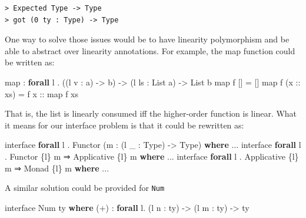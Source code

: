 \documentclass[
]{article}
\newenvironment{Shaded}{}{}
\newcommand{\DataTypeTok}[1]{\textcolor[rgb]{0.56,0.13,0.00}{#1}}
\newcommand{\FunctionTok}[1]{\textcolor[rgb]{0.02,0.16,0.49}{#1}}
\newcommand{\KeywordTok}[1]{\textcolor[rgb]{0.00,0.44,0.13}{\textbf{#1}}}
\newcommand{\NormalTok}[1]{#1}
\newcommand{\OperatorTok}[1]{\textcolor[rgb]{0.40,0.40,0.40}{#1}}
\newcommand{\OtherTok}[1]{\textcolor[rgb]{0.00,0.44,0.13}{#1}}
\begin{document}
\begin{verbatim}
> Expected Type -> Type
> got (0 ty : Type) -> Type
\end{verbatim}

One way to solve those issues would be to have linearity polymorphism
and be able to abstract over linearity annotations. For example, the map
function could be written as:

\begin{Shaded}
\begin{Highlighting}[]
\FunctionTok{map} \OperatorTok{:} \KeywordTok{forall}\NormalTok{ l }\OperatorTok{.}\NormalTok{ ((l v }\OperatorTok{:}\NormalTok{ a) }\OtherTok{{-}\textgreater{}}\NormalTok{ b) }\OtherTok{{-}\textgreater{}}\NormalTok{ (l ls }\OperatorTok{:} \DataTypeTok{List}\NormalTok{ a) }\OtherTok{{-}\textgreater{}} \DataTypeTok{List}\NormalTok{ b}
\FunctionTok{map}\NormalTok{ f [] }\OtherTok{=}\NormalTok{ []}
\FunctionTok{map}\NormalTok{ f (}\OtherTok{x ::}\NormalTok{ xs) }\OtherTok{=}\NormalTok{ f}\OtherTok{ x ::} \FunctionTok{map}\NormalTok{ f xs}
\end{Highlighting}
\end{Shaded}

That is, the list is linearly consumed iff the higher-order function is
linear. What it means for our interface problem is that it could be
rewritten as:

\begin{Shaded}
\begin{Highlighting}[]
\NormalTok{interface }\KeywordTok{forall}\NormalTok{ l }\OperatorTok{.} \DataTypeTok{Functor}\NormalTok{ (m }\OperatorTok{:}\NormalTok{ (l \_ }\OperatorTok{:} \DataTypeTok{Type}\NormalTok{) }\OtherTok{{-}\textgreater{}} \DataTypeTok{Type}\NormalTok{) }\KeywordTok{where}
    \OperatorTok{...}
\NormalTok{interface }\KeywordTok{forall}\NormalTok{ l }\OperatorTok{.} \DataTypeTok{Functor}\NormalTok{ \{l\} m }\OtherTok{⇒} \DataTypeTok{Applicative}\NormalTok{ \{l\} m }\KeywordTok{where}
    \OperatorTok{...}
\NormalTok{interface }\KeywordTok{forall}\NormalTok{ l }\OperatorTok{.} \DataTypeTok{Applicative}\NormalTok{ \{l\} m }\OtherTok{⇒} \DataTypeTok{Monad}\NormalTok{ \{l\} m }\KeywordTok{where}
    \OperatorTok{...}
\end{Highlighting}
\end{Shaded}

A similar solution could be provided for \texttt{Num}

\begin{Shaded}
\begin{Highlighting}[]
\NormalTok{interface }\DataTypeTok{Num}\NormalTok{ ty }\KeywordTok{where}
\NormalTok{    (}\OperatorTok{+}\NormalTok{) }\OperatorTok{:} \KeywordTok{forall}\NormalTok{ l}\OperatorTok{.}\NormalTok{ (l n }\OperatorTok{:}\NormalTok{ ty) }\OtherTok{{-}\textgreater{}}\NormalTok{ (l m }\OperatorTok{:}\NormalTok{ ty) }\OtherTok{{-}\textgreater{}}\NormalTok{ ty}
\end{Highlighting}
\end{Shaded}
\end{document}
